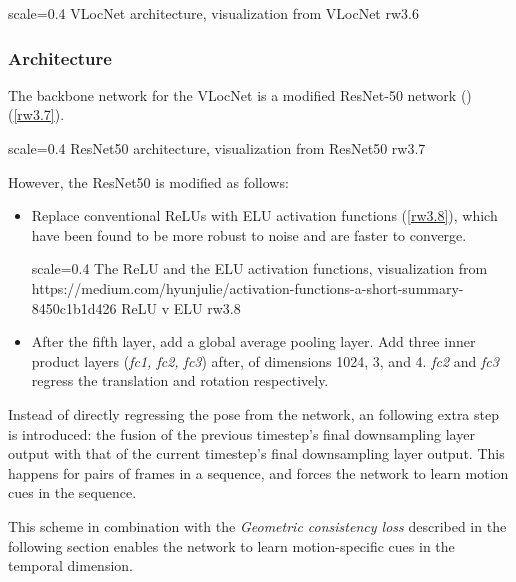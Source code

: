 {scale=0.4}%
{VLocNet architecture, visualization from \cite{Valada2018}}%
{VLocNet}%
{rw3.6} %

\subsubsection{Architecture}
The backbone network for the VLocNet is a modified ResNet-50 network (\cite{He2015})(\ref{rw3.7}).

{scale=0.4}%
{ResNet50 architecture, visualization from \cite{Mahmood2020}}%
{ResNet50}%
{rw3.7} %

However, the ResNet50 is modified as follows:

\begin{itemize}
	\item Replace conventional ReLUs with ELU activation functions (\ref{rw3.8}), which have been found to be more robust to noise and are faster to converge.
	
    {scale=0.4}%
    {The ReLU and the ELU activation functions, visualization from https://medium.com/hyunjulie/activation-functions-a-short-summary-8450c1b1d426}%
    {ReLU v ELU}%
	{rw3.8} %

	\item After the fifth layer, add a global average pooling layer. Add three inner product layers (\textit{fc1, fc2, fc3}) after, of dimensions 1024, 3, and 4.
\emph{fc2} and \emph{fc3} regress the translation and rotation respectively. 
\end{itemize}

	Instead of directly regressing the pose from the network, an following extra step is introduced: the fusion of the previous timestep's final downsampling layer output
with that of the current timestep's final downsampling layer output. This happens for pairs of frames in a sequence, and forces the network to learn motion cues in the sequence.

This scheme in combination with the \emph{Geometric consistency loss} described in the following section enables the network to learn motion-specific cues in the 
temporal dimension.

